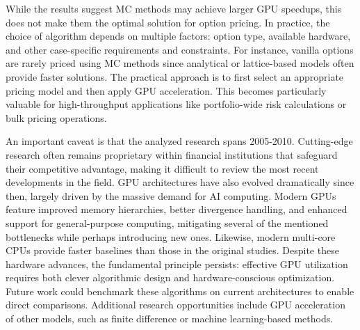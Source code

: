 \documentclass[english,12pt,a4paper,pdftex,sci,utf8]{aaltothesis}
\begin{document}
While the results suggest MC methods may achieve larger GPU speedups, this does not make them the optimal solution for option pricing. In practice, the choice of algorithm depends on multiple factors: option type, available hardware, and other case-specific requirements and constraints. For instance, vanilla options are rarely priced using MC methods since analytical or lattice-based models often provide faster solutions. The practical approach is to first select an appropriate pricing model and then apply GPU acceleration. This becomes particularly valuable for high-throughput applications like portfolio-wide risk calculations or bulk pricing operations.

An important caveat is that the analyzed research spans 2005-2010. Cutting-edge research often remains proprietary within financial institutions that safeguard their competitive advantage, making it difficult to review the most recent developments in the field. GPU architectures have also evolved dramatically since then, largely driven by the massive demand for AI computing. Modern GPUs feature improved memory hierarchies, better divergence handling, and enhanced support for general-purpose computing, mitigating several of the mentioned bottlenecks while perhaps introducing new ones. Likewise, modern multi-core CPUs provide faster baselines than those in the original studies. Despite these hardware advances, the fundamental principle persists: effective GPU utilization requires both clever algorithmic design and hardware-conscious optimization. Future work could benchmark these algorithms on current architectures to enable direct comparisons. Additional research opportunities include GPU acceleration of other models, such as finite difference or machine learning-based methods.
\end{document}

